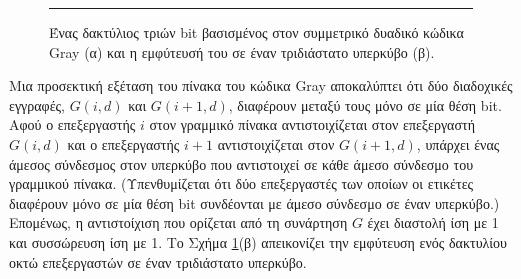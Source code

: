 \documentclass[12pt,a4paper]{article}
\begin{document}
\begin{figure}[H]
\noindent\rule{\textwidth}{0.2pt}
\caption{Ένας δακτύλιος τριών \foreignlanguage{english}{bit} βασισμένος 
στον συμμετρικό δυαδικό κώδικα \foreignlanguage{english}{Gray} (α) και 
η εμφύτευσή του σε έναν τριδιάστατο υπερκύβο (β).}
\label{fig:graph49}
\end{figure}
\vspace{0.3cm}

Μια προσεκτική εξέταση του πίνακα του κώδικα \foreignlanguage{english}{Gray}
αποκαλύπτει ότι δύο διαδοχικές εγγραφές, $G(i,d)$ και $G(i+1,d)$, διαφέρουν 
μεταξύ τους μόνο σε μία θέση \foreignlanguage{english}{bit}. Αφού ο 
επεξεργαστής $i$ στον γραμμικό πίνακα αντιστοιχίζεται στον επεξεργαστή 
$G(i,d)$ και ο επεξεργαστής $i+1$ αντιστοιχίζεται στον $G(i+1,d)$, υπάρχει 
ένας άμεσος σύνδεσμος στον υπερκύβο που αντιστοιχεί σε κάθε άμεσο 
σύνδεσμο του γραμμικού πίνακα. (Υπενθυμίζεται ότι δύο επεξεργαστές 
των οποίων οι ετικέτες διαφέρουν μόνο σε μία θέση \foreignlanguage{english}{bit}
συνδέονται με άμεσο σύνδεσμο σε έναν υπερκύβο.) Επομένως, η αντιστοίχιση 
που ορίζεται από τη συνάρτηση $G$ έχει διαστολή ίση με 1 και συσσώρευση 
ίση με 1. Το Σχήμα \ref{fig:graph49}(β) απεικονίζει την εμφύτευση ενός 
δακτυλίου οκτώ επεξεργαστών σε έναν τριδιάστατο υπερκύβο.
\end{document}
